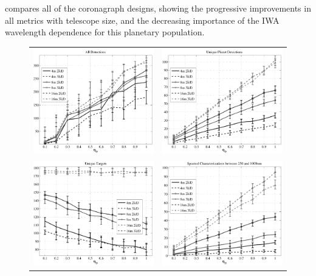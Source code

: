   compares all of the coronagraph designs, showing the progressive improvements in all metrics with telescope size, and the decreasing importance of the IWA wavelength dependence for this planetary population. 
 \begin{figure}[ht]
 \begin{center}
  \begin{tabular}{c c}
   \includegraphics[width=2.9in]{./figures/coronagraphs_ADETs} &
   \includegraphics[width=2.9in]{./figures/coronagraphs_AuDETs} \\
   \includegraphics[width=2.9in]{./figures/coronagraphs_Auvisits} &
   \includegraphics[width=2.9in]{./figures/coronagraphs_ASPECTRA}

\end{tabular}
\end{center}
\end{figure}
